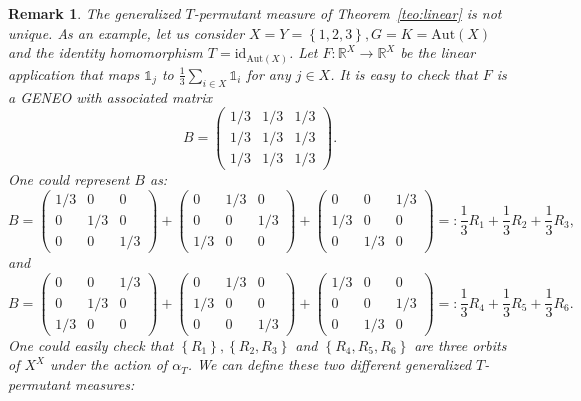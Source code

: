 \documentclass[11pt]{article}
\newcommand{\R}{\mathbb{R}}
\newcommand{\Aut}{\mathrm{Aut}}
\newtheorem{rem}[theorem]{Remark}
\begin{document}
\begin{rem}
    \label{rem:noinj}
    The generalized $T$-permutant measure of Theorem~\ref{teo:linear} is not unique. As an example, let us consider $X = Y = \left\{ 1, 2, 3 \right\}, G = K = \Aut(X)$ and the identity homomorphism $T = \mathrm{id}_{\Aut(X)}$. Let $F \colon \R^X \to \R^X$ be the linear application that maps $\mathds{1}_j$ to $\frac{1}{3}\sum_{i \in X} \mathds{1}_i$ for any $j \in X$. It is easy to check that $F$ is a GENEO with associated matrix
    \[ B = 
    \begin{pmatrix}
        1/3 & 1/3 & 1/3 \\
        1/3 & 1/3 & 1/3 \\
        1/3 & 1/3 & 1/3
    \end{pmatrix}.
    \]
    One could represent $B$ as:
    \[ B = 
    \begin{pmatrix}
        1/3 & 0 & 0 \\
        0 & 1/3 & 0 \\
        0 & 0 & 1/3
    \end{pmatrix} + \begin{pmatrix}
        0 & 1/3 & 0 \\
        0 & 0 & 1/3 \\
        1/3 & 0 & 0
    \end{pmatrix} +     \begin{pmatrix}
        0 & 0 & 1/3 \\
        1/3 & 0 & 0 \\
        0 & 1/3 & 0
    \end{pmatrix} =: \frac{1}{3}R_1 + \frac{1}{3}R_2 + \frac{1}{3}R_3,
    \] and
    \[ B = 
    \begin{pmatrix}
        0 & 0 & 1/3 \\
        0 & 1/3 & 0 \\
        1/3 & 0 & 0
    \end{pmatrix} + \begin{pmatrix}
        0 & 1/3 & 0 \\
        1/3 & 0 & 0 \\
        0 & 0 & 1/3
    \end{pmatrix} +     \begin{pmatrix}
        1/3 & 0 & 0 \\
        0 & 0 & 1/3 \\
        0 & 1/3 & 0
    \end{pmatrix} =: \frac{1}{3}R_4 + \frac{1}{3}R_5 + \frac{1}{3}R_6.
    \]
    One could easily check that $\left\{R_1 \right\}, \left\{R_2, R_3 \right\}$ and $\left\{R_4, R_5, R_6 \right\}$ are three orbits of $X^X$ under the action of $\alpha_T$. We can define these two different generalized $T$-permutant measures:

\end{rem}
\end{document}
